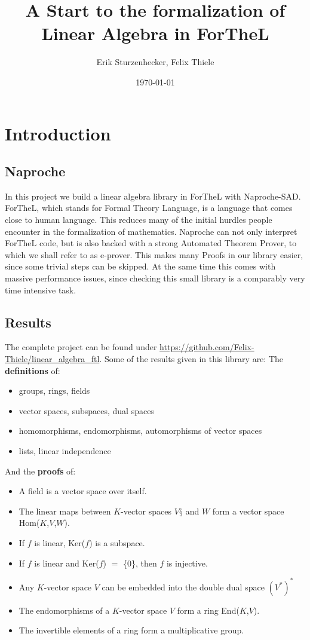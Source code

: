 \documentclass[11pt]{article}
\author{Erik Sturzenhecker, Felix Thiele}
\title{A Start to the formalization of Linear Algebra in ForTheL}
\date{\today}
\begin{document}
\maketitle
\newpage 
\setcounter{tocdepth}{10}
\tableofcontents

\newpage 
\section{Introduction}
\subsection{Naproche}
In this project we build a linear algebra library in ForTheL with Naproche-SAD. ForTheL, which stands for Formal Theory Language, is a language that comes close to human language. This reduces many of the initial hurdles people encounter in the formalization of mathematics. Naproche can not only interpret ForTheL code, but is also backed with a strong Automated Theorem Prover, to which we shall refer to as e-prover. This makes many Proofs in our library easier, since some trivial steps can be skipped. At the same time this comes with massive performance issues, since checking this small library is a comparably very time intensive task.

\subsection{Results}
The complete project can be found under \url{https://github.com/Felix-Thiele/linear_algebra_ftl}.
Some of the results given in this library are:
\newline
The \textbf{definitions} of:
\begin{itemize}[nolistsep, noitemsep]
\item groups, rings, fields
\item vector spaces, subspaces, dual spaces
\item homomorphisms, endomorphisms, automorphisms of vector spaces
\item lists, linear independence
\end{itemize}
And the \textbf{proofs} of:
\begin{itemize}[nolistsep, noitemsep]
\item A field is a vector space over itself.
\item The linear maps between $K$-vector spaces $V§$ and $W$ form a vector space Hom($K$,$V$,$W$).
\item If $f$ is linear, Ker($f$) is a subspace.
\item If $f$ is linear and Ker($f$) $=$ \{0\}, then $f$ is injective.
\item Any $K$-vector space $V$ can be embedded into the double dual space $(V^{*})^{*}$
\item The endomorphisms of a $K$-vector space $V$ form a ring End($K$,$V$).
\item The invertible elements of a ring form a multiplicative group.
\end{itemize}
\end{document}
